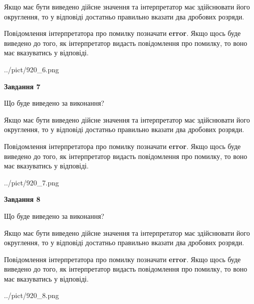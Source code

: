 \documentclass[12pt, ukrainian]{article}
\begin{document}
{\begin {Large}
Якщо має бути виведено дійсне значення та інтерпретатор має здійснювати його округлення, 
то у відповіді достатньо правильно вказати два дробових розряди.

Повідомлення інтерпретатора про помилку позначати \textbf{error}.
Якщо щось буде виведено до того, як інтерпретатор видасть повідомлення про помилку, 
то воно має вказуватись у відповіді. \par

\begin{center}
	{../pict/920_6.png}
\end{center}
\newpage

{\begin {center}\textbf{Завдання 7}\end {center}}\par
Що буде виведено за виконання? \par

Якщо має бути виведено дійсне значення та інтерпретатор має здійснювати його округлення, 
то у відповіді достатньо правильно вказати два дробових розряди.

Повідомлення інтерпретатора про помилку позначати \textbf{error}.
Якщо щось буде виведено до того, як інтерпретатор видасть повідомлення про помилку, 
то воно має вказуватись у відповіді. \par

\begin{center}
	{../pict/920_7.png}
\end{center}
\newpage

{\begin {center}\textbf{Завдання 8}\end {center}}\par
Що буде виведено за виконання? \par

Якщо має бути виведено дійсне значення та інтерпретатор має здійснювати його округлення, 
то у відповіді достатньо правильно вказати два дробових розряди.

Повідомлення інтерпретатора про помилку позначати \textbf{error}.
Якщо щось буде виведено до того, як інтерпретатор видасть повідомлення про помилку, 
то воно має вказуватись у відповіді. \par

\begin{center}
	{../pict/920_8.png}
\end{center}
\newpage


\end{Large}}
\end{document}
